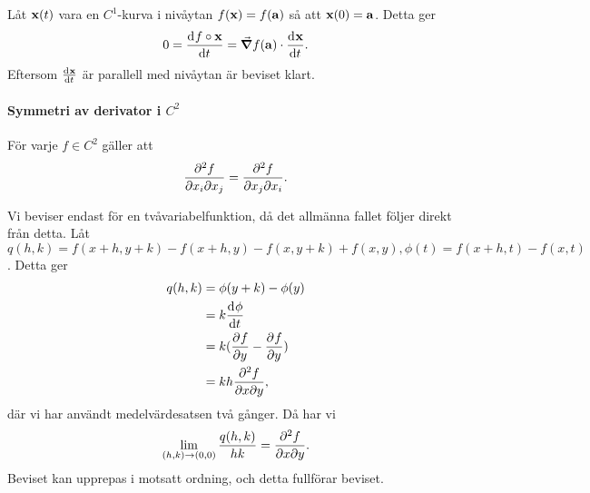 \proof
Låt $\vect{x}(t)$ vara en $C^1$-kurva i nivåytan $f(\vect{x}) = f(\vect{a})$ så att $\vect{x}(0) = \vect{a}$. Detta ger
\begin{align*}
	0 = \deval{f\circ \vect{x}}{t}{0} = \grad{f}(\vect{a})\cdot\deval{\vect{x}}{t}{0}.
\end{align*}
Eftersom $\deval{\vect{x}}{t}{0}$ är parallell med nivåytan är beviset klart.

\paragraph{Symmetri av derivator i $C^2$}
För varje $f\in C^2$ gäller att
\begin{align*}
	\pdv{f}{x_i}{x_j} = \pdv{f}{x_j}{x_i}.
\end{align*}

\proof
Vi beviser endast för en tvåvariabelfunktion, då det allmänna fallet följer direkt från detta. Låt $q(h, k) = f(x + h, y + k) - f(x + h, y) - f(x, y + k) + f(x, y), \phi(t) = f(x + h, t) - f(x, t)$. Detta ger
\begin{align*}
	q(h, k) &= \phi(y + k) - \phi(y) \\
	        &= k\dv[]{\phi}{t} (y + \theta k) \\
	        &= k(\pdv[]{f}{y} (x + h, y + \theta k) - \pdv[]{f}{y} (x, y + \theta k)) \\
	        &= kh\pdv{f}{x}{y} (x + \eta h, y + \theta k),
\end{align*}
där vi har användt medelvärdesatsen två gånger. Då har vi
\begin{align*}
	\lim\limits_{(h, k)\to (0, 0)}\frac{q(h, k)}{hk} = \pdv{f}{x}{y} (x, y).
\end{align*}
Beviset kan upprepas i motsatt ordning, och detta fullförar beviset.